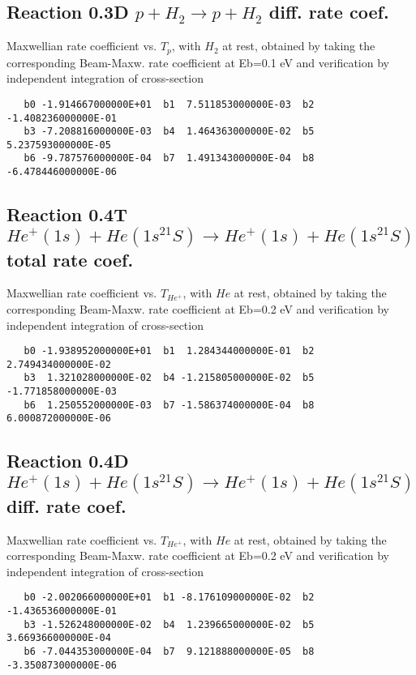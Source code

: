 \documentclass[12pt,dvipdfmx]{article}
\begin{document}
\subsection{
Reaction 0.3D  $p + H_2 \rightarrow p + H_2$ diff. rate coef.
}
Maxwellian rate coefficient vs. $T_p$, with $H_2$ at rest, obtained by taking
the corresponding Beam-Maxw. rate coefficient at Eb=0.1 eV and
verification by independent integration of cross-section
\begin{small}\begin{verbatim}
   b0 -1.914667000000E+01  b1  7.511853000000E-03  b2 -1.408236000000E-01
   b3 -7.208816000000E-03  b4  1.464363000000E-02  b5  5.237593000000E-05
   b6 -9.787576000000E-04  b7  1.491343000000E-04  b8 -6.478446000000E-06
\end{verbatim}\end{small}

\subsection{
Reaction 0.4T  $He^+(1s) + He(1s^21S) \rightarrow He^+(1s) + He(1s^21S)$ total rate coef.
}
Maxwellian rate coefficient vs. $T_{He^+}$, with $He$ at rest, obtained by taking
the corresponding Beam-Maxw. rate coefficient at Eb=0.2 eV and
verification by independent integration of cross-section
\begin{small}\begin{verbatim}
   b0 -1.938952000000E+01  b1  1.284344000000E-01  b2  2.749434000000E-02
   b3  1.321028000000E-02  b4 -1.215805000000E-02  b5 -1.771858000000E-03
   b6  1.250552000000E-03  b7 -1.586374000000E-04  b8  6.000872000000E-06
\end{verbatim}\end{small}


\subsection{
Reaction 0.4D  $He^+(1s) + He(1s^21S) \rightarrow He^+(1s) + He(1s^21S)$ diff. rate coef.
}
Maxwellian rate coefficient vs. $T_{He^+}$, with $He$ at rest, obtained by taking
the corresponding Beam-Maxw. rate coefficient at Eb=0.2 eV and
verification by independent integration of cross-section
\begin{small}\begin{verbatim}
   b0 -2.002066000000E+01  b1 -8.176109000000E-02  b2 -1.436536000000E-01
   b3 -1.526248000000E-02  b4  1.239665000000E-02  b5  3.669366000000E-04
   b6 -7.044353000000E-04  b7  9.121888000000E-05  b8 -3.350873000000E-06
\end{verbatim}\end{small}
\end{document}
